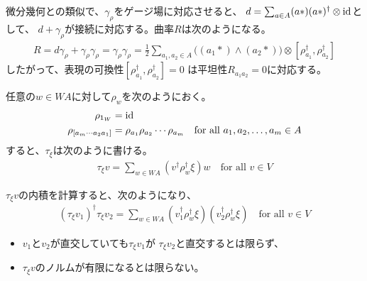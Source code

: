\begin{itemize}
				\begin{note}[微分幾何との類似]\label{note:微分幾何との類似} %
					微分幾何との類似で、$\gamma_\rho$をゲージ場に対応させると、
					$d=\sum_{a\in A}(a*)(a*)^\dag\otimes{\operatorname{id}}$として、
					$d+\gamma_\rho$が接続に対応する。曲率$R$は次のようになる。
					\begin{equation*}\begin{split} %
						R = d\gamma_\rho + \gamma_\rho\gamma_\rho
						= \gamma_\rho\gamma_\rho
						= \frac{1}{2}\sum_{a_1,a_2\in A}\bigl((a_1*)\land(a_2*)\bigr)
							\otimes[\rho_{a_1}^\dag,\rho_{a_2}^\dag]
					\end{split}\end{equation*} %
					したがって、表現の可換性$[\rho_{a_1}^\dag,\rho_{a_2}^\dag]=0$
					は平坦性$R_{a_1a_2}=0$に対応する。
				\end{note} %

				任意の$w\in WA$に対して$\rho_w$を次のようにおく。
				\begin{equation*}\begin{split} %
					\rho_{1_W} &= \myid \\
					\rho_{[a_m\cdots a_2a_1]}
					&= \rho_{a_1}\rho_{a_2}\cdots \rho_{a_m}
					\quad\text{for all }a_1,a_2,\dots,a_m\in A
				\end{split}\end{equation*} %
				すると、$\tau_\xi$は次のように書ける。
				\begin{equation*}\begin{split} %
					\tau_\xi v = \sum_{w\in WA}(v^\dag\rho_w^\dag\xi)w
					\quad\text{for all }v\in V
				\end{split}\end{equation*} %

				\begin{note}[ノルムの発散]\label{note:ノルムの発散} %
					$\tau_\xi v$の内積を計算すると、次のようになり、
					\begin{equation*}\begin{split} %
						(\tau_\xi v_1)^\dag \tau_\xi v_2 = \sum_{w\in WA}
						(v_1^\dag\rho_w^\dag\xi)(v_2^\dag\rho_w^\dag\xi)
						\quad\text{for all }v\in V
					\end{split}\end{equation*} %
					\begin{itemize}\setlength{\itemsep}{-1mm} %
						\item $v_1$と$v_2$が直交していても$\tau_\xi v_1$が
						$\tau_\xi v_2$と直交するとは限らず、
						\item $\tau_\xi v$のノルムが有限になるとは限らない。
					\end{itemize} %
				\end{note} %
			\end{itemize} %

